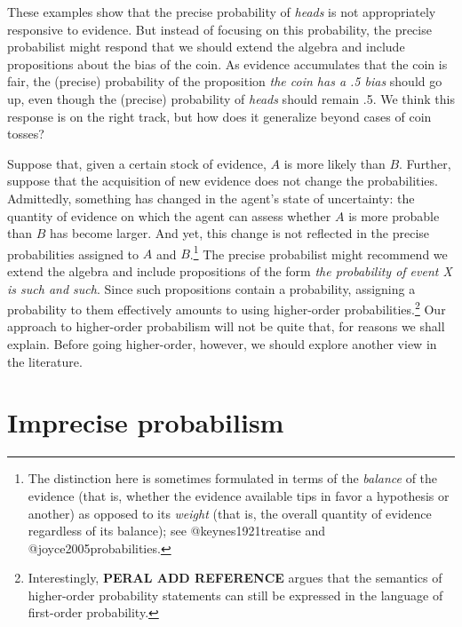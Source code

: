 \documentclass[
  letterpaper,
  DIV=11,
  numbers=noendperiod]{scrartcl}
\begin{document}
These examples show that the precise probability of \emph{heads} is not
appropriately responsive to evidence. But instead of focusing on this
probability, the precise probabilist might respond that we should extend
the algebra and include propositions about the bias of the coin. As
evidence accumulates that the coin is fair, the (precise) probability of
the proposition \emph{the coin has a .5 bias} should go up, even though
the (precise) probability of \emph{heads} should remain .5. We think
this response is on the right track, but how does it generalize beyond
cases of coin tosses?

Suppose that, given a certain stock of evidence, \(A\) is more likely
than \(B\). Further, suppose that the acquisition of new evidence does
not change the probabilities. Admittedly, something has changed in the
agent's state of uncertainty: the quantity of evidence on which the
agent can assess whether \(A\) is more probable than \(B\) has become
larger. And yet, this change is not reflected in the precise
probabilities assigned to \(A\) and \(B\).\footnote{The distinction here
  is sometimes formulated in terms of the \emph{balance} of the evidence
  (that is, whether the evidence available tips in favor a hypothesis or
  another) as opposed to its \emph{weight} (that is, the overall
  quantity of evidence regardless of its balance); see
  @keynes1921treatise and @joyce2005probabilities.} The precise
probabilist might recommend we extend the algebra and include
propositions of the form
\emph{the probability of event X is such and such}. Since such
propositions contain a probability, assigning a probability to them
effectively amounts to using higher-order probabilities.\footnote{Interestingly,
  \textbf{PERAL ADD REFERENCE} argues that the semantics of higher-order
  probability statements can still be expressed in the language of
  first-order probability.} Our approach to higher-order probabilism
will not be quite that, for reasons we shall explain. Before going
higher-order, however, we should explore another view in the literature.

\section{Imprecise probabilism}\label{imprecise-probabilism}

\label{sec:imprecise-probabilism}
\end{document}

